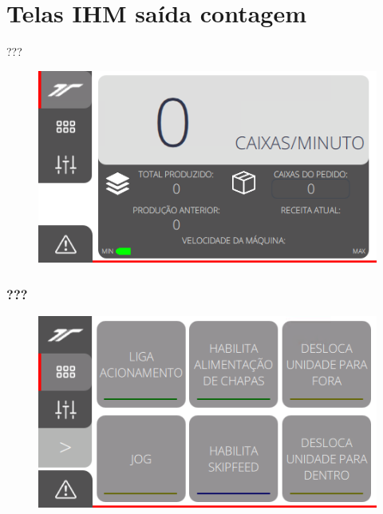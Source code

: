 \thispagestyle{fancy}
\vspace*{\fill}
\section{Telas IHM saída contagem}
 ???
\begin{figure}[h]
  \centering
  \includegraphics{src/imagesFlexo/12-IHMCNT/e-1.png}
\end{figure}
\vspace*{\fill}

\newpage
\thispagestyle{fancy}
\vspace*{\fill}
\subsubsection{\small{???}}
\begin{figure}[h]
  \centering
  \includegraphics{src/imagesFlexo/12-IHMCNT/e-2.png}
\end{figure}
\vspace*{\fill}

\newpage
\thispagestyle{fancy}
\vspace*{\fill}
